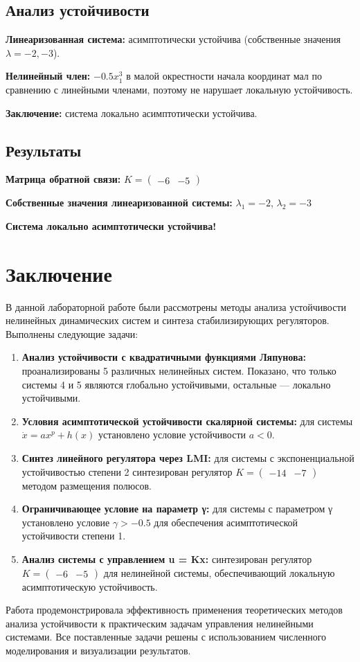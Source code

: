 \subsection*{Анализ устойчивости}

\textbf{Линеаризованная система:} асимптотически устойчива (собственные значения $\lambda = -2, -3$).

\textbf{Нелинейный член:} $-0.5x_1^3$ в малой окрестности начала координат мал по сравнению с линейными членами, поэтому не нарушает локальную устойчивость.

\textbf{Заключение:} система локально асимптотически устойчива.

\subsection*{Результаты}

\textbf{Матрица обратной связи:} $K = \begin{pmatrix} -6 & -5 \end{pmatrix}$

\textbf{Собственные значения линеаризованной системы:} $\lambda_1 = -2$, $\lambda_2 = -3$

\textbf{Система локально асимптотически устойчива!}

\section*{Заключение}

В данной лабораторной работе были рассмотрены методы анализа устойчивости нелинейных динамических систем и синтеза стабилизирующих регуляторов. Выполнены следующие задачи:

\begin{enumerate}
\item \textbf{Анализ устойчивости с квадратичными функциями Ляпунова:} проанализированы 5 различных нелинейных систем. Показано, что только системы 4 и 5 являются глобально устойчивыми, остальные — локально устойчивыми.

\item \textbf{Условия асимптотической устойчивости скалярной системы:} для системы $\dot{x} = ax^p + h(x)$ установлено условие устойчивости $a < 0$.

\item \textbf{Синтез линейного регулятора через LMI:} для системы с экспоненциальной устойчивостью степени 2 синтезирован регулятор $K = \begin{pmatrix} -14 & -7 \end{pmatrix}$ методом размещения полюсов.

\item \textbf{Ограничивающее условие на параметр γ:} для системы с параметром γ установлено условие $\gamma > -0.5$ для обеспечения асимптотической устойчивости степени 1.

\item \textbf{Анализ системы с управлением u = Kx:} синтезирован регулятор $K = \begin{pmatrix} -6 & -5 \end{pmatrix}$ для нелинейной системы, обеспечивающий локальную асимптотическую устойчивость.
\end{enumerate}

Работа продемонстрировала эффективность применения теоретических методов анализа устойчивости к практическим задачам управления нелинейными системами. Все поставленные задачи решены с использованием численного моделирования и визуализации результатов.
